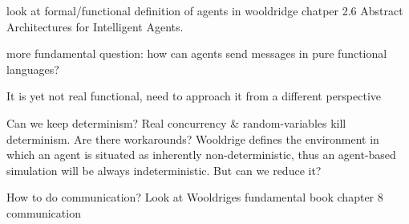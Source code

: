 look at formal/functional definition of agents in wooldridge chatper 2.6 Abstract Architectures for Intelligent Agents. 

more fundamental question: how can agents send messages in pure functional languages?


\item It is yet not real functional, need to approach it from a different perspective
\item Can we keep determinism? Real concurrency \& random-variables kill determinism. Are there workarounds? Wooldrige defines the environment in which an agent is situated as inherently non-deterministic, thus an agent-based simulation will be always indeterministic. But can we reduce it?

\item How to do communication? Look at Wooldriges fundamental book chapter 8 communication